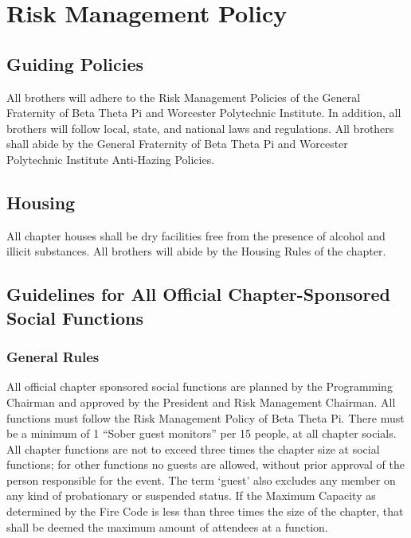 \chapter{Risk Management Policy}
\label{cha:risk-management-policy}

\section{Guiding Policies}

All brothers will adhere to the Risk Management Policies of the General
Fraternity of Beta Theta Pi and Worcester Polytechnic Institute.
In addition, all brothers will follow local, state, and national laws and
regulations.
All brothers shall abide by the General Fraternity of Beta Theta Pi and
Worcester Polytechnic Institute Anti-Hazing Policies.

\section{Housing}

All chapter houses shall be dry facilities free from the presence of alcohol
and illicit substances.
All brothers will abide by the Housing Rules of the chapter.

\section{Guidelines for All Official Chapter-Sponsored Social Functions}

\subsection{General Rules}

All official chapter sponsored social functions are planned by the Programming
Chairman and approved by the President and Risk Management Chairman.
All functions must follow the Risk Management Policy of Beta Theta Pi.
There must be a minimum of 1 “Sober guest monitors” per 15 people, at all
chapter socials.
All chapter functions are not to exceed three times the chapter size at social
functions; for other functions no guests are allowed, without prior approval of
the person responsible for the event.
The term ‘guest’ also excludes any member on any kind of probationary or
suspended status.
If the Maximum Capacity as determined by the Fire Code is less than three times
the size of the chapter, that shall be deemed the maximum amount of attendees
at a function.

